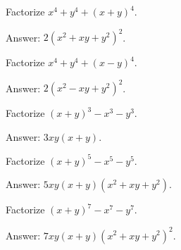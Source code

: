 \documentclass[12pt,a4paper]{memoir}
\theoremstyle{definition}
\begin{document}
\begin{tcolorbox}
	\begin{question}
		Factorize $x^4+y^4+(x+y)^4$.
	\end{question}
\end{tcolorbox}

\begin{solution}
	Answer: $2(x^2+xy+y^2)^2$.
\end{solution}


\begin{tcolorbox}
	\begin{question}
		Factorize $x^4+y^4+(x-y)^4$.
	\end{question}
\end{tcolorbox}

\begin{solution}
	Answer: $2(x^2-xy+y^2)^2$.
\end{solution}



\begin{tcolorbox}
	\begin{question}
		Factorize $(x+y)^3 - x^3 - y^3$.
	\end{question}
\end{tcolorbox}

\begin{solution}
	Answer: $3xy(x+y)$.
\end{solution}


\begin{tcolorbox}
	\begin{question}
		Factorize $(x+y)^5 - x^5 - y^5$.
	\end{question}
\end{tcolorbox}

\begin{solution}
	Answer: $5xy(x+y)(x^2+xy+y^2)$.
\end{solution}


\begin{tcolorbox}
	\begin{question}
		Factorize $(x+y)^7 - x^7 - y^7$.
	\end{question}
\end{tcolorbox}

\begin{solution}
	Answer: $7xy(x+y)(x^2+xy+y^2)^2$.
\end{solution}
\end{document}
